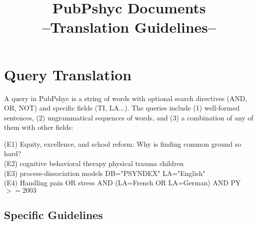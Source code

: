 \documentclass[a4paper,10pt]{article}
\title{PubPshyc Documents \\ --Translation Guidelines--}
\author{}
\newcommand{\exTit}[1]{\begin{tcolorbox}[enhanced,attach boxed title to top center={yshift=-3mm,yshifttext=-1mm},title=Examples,coltitle=black,colbacktitle=white]{#1}\end{tcolorbox}}
\begin{document}
\maketitle

% 

\section{Query Translation}
\label{s:queries}
A query in PubPshyc is a string of words with optional search directives (AND, OR, NOT) and specific fields (TI, LA...). 
The queries include (1) well-formed sentences, (2) ungrammatical sequences of words, and (3) a combination of any of them with other fields:


\medskip
\exTit{(E1) Equity, excellence, and school reform: Why is finding common ground so hard? \\
(E2) cognitive behavioral therapy physical trauma children \\
(E3) process-dissociation models DB="PSYNDEX" LA="English" \\
(E4) Handling pain OR stress AND (LA=French OR LA=German) AND PY$>=2003$}



\subsection{Specific Guidelines}
\label{ss:q_guidelines}
\end{document}
